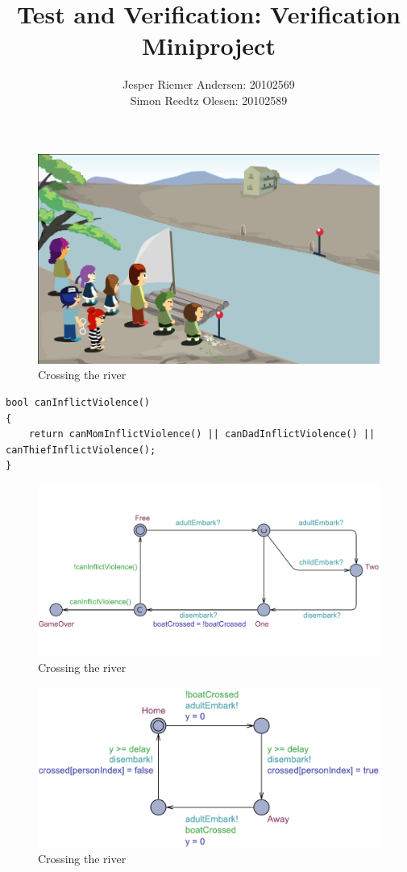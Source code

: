 \documentclass[a4paper,12pt]{article}
\title{Test and Verification: Verification Miniproject}
\author{Jesper Riemer Andersen: 20102569\\Simon Reedtz Olesen: 20102589}
\begin{document}
\maketitle

\begin{figure}[H]
\centering
\includegraphics[width=0.8\linewidth]{Crossing_The_River.png}
\caption{Crossing the river}
\end{figure}

\begin{lstlisting}
bool canInflictViolence()
{
    return canMomInflictViolence() || canDadInflictViolence() || canThiefInflictViolence();
}
\end{lstlisting}

\begin{figure}[H]
\centering
\includegraphics[width=\linewidth]{Boat.pdf}
\caption{Crossing the river}
\end{figure}

\begin{figure}[H]
\centering
\includegraphics[width=\linewidth]{Adult.pdf}
\caption{Crossing the river}
\end{figure}
\end{document}
